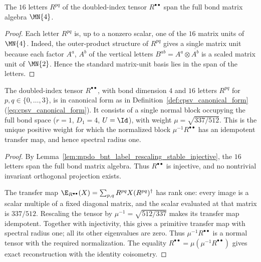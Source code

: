\begin{lemma}%
    \label{lem:mpdo_bnt_label_rescaling_stable_injective}
    \leanok
    The $16$ letters $R^{pq}$ of the doubled-index tensor
    $R^{\bullet\bullet}$ span the full bond matrix algebra $\MN{4}$.
\end{lemma}

\begin{proof}\leanok
    Each letter $R^{pq}$ is, up to a nonzero scalar, one of the $16$
    matrix units of $\MN{4}$. Indeed, the outer-product
    structure of $R^{pq}$ gives a single matrix unit because
    each factor $A^a$, $A^b$ of the vertical letters
    $B^{ab}=A^a\otimes\overline{A^b}$ is a scaled matrix unit of $\MN{2}$.
    Hence the standard matrix-unit basis lies in the span of the letters.
\end{proof}

\begin{lemma}%
    \label{thm:mpdo_bnt_label_rescaling_stable_cf}
    \leanok
    The doubled-index tensor $R^{\bullet\bullet}$, with bond dimension $4$
    and $16$ letters $R^{pq}$ for $p,q\in\{0,\ldots,3\}$, is in canonical form
    as in Definition~\ref{def:cpsv_canonical_form}
    (\ref{eq:cpsv_canonical_form}).
    It consists of a single normal block occupying the full bond
    space ($r=1$, $D_1=4$, $U=\Id$), with weight
    $\mu=\sqrt{337/512}$. This is the unique positive weight for which
    the normalized block $\mu^{-1}R^{\bullet\bullet}$ has an idempotent
    transfer map, and hence spectral radius one.
\end{lemma}
\begin{proof}\leanok
    By Lemma~\ref{lem:mpdo_bnt_label_rescaling_stable_injective}, the $16$
    letters span the full bond matrix algebra. Thus
    $R^{\bullet\bullet}$ is injective, and no nontrivial invariant orthogonal
    projection exists.

    The transfer map
    $\E_{R^{\bullet\bullet}}(X)=\sum_{p,q}R^{pq}X(R^{pq})^\dagger$
    has rank one: every image is a scalar multiple of a fixed diagonal
    matrix, and the scalar evaluated at that matrix is $337/512$.
    Rescaling the tensor by $\mu^{-1}=\sqrt{512/337}$ makes its transfer map
    idempotent. Together with injectivity, this gives a primitive transfer
    map with spectral radius one; all its other eigenvalues are zero.
    Thus $\mu^{-1}R^{\bullet\bullet}$ is a normal tensor with the required
    normalization. The equality
    $R^{\bullet\bullet}=\mu(\mu^{-1}R^{\bullet\bullet})$ gives exact
    reconstruction with the identity coisometry.
\end{proof}

